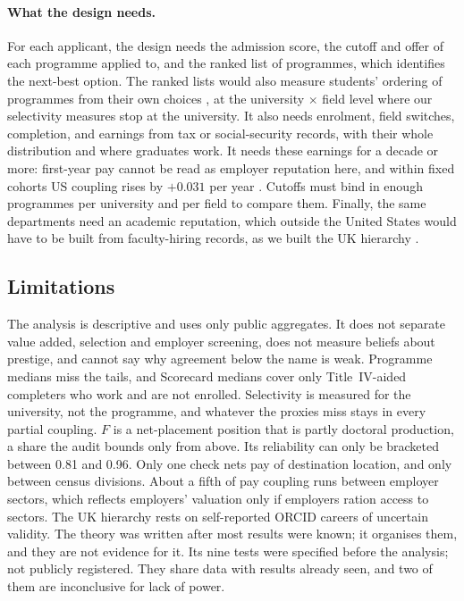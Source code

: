 \paragraph{What the design needs.} For each applicant, the design needs the admission score, the cutoff and offer of
each programme applied to, and the ranked list of programmes, which identifies the next-best option. The ranked
lists would also measure students' ordering of programmes from their own choices \citep{avery2013revealed}, at the
university $\times$ field level where our selectivity measures stop at the university. It also needs enrolment,
field switches, completion, and earnings from tax or social-security records, with their whole distribution and
where graduates work. It needs these earnings for a decade or more: first-year pay cannot be read as employer
reputation here, and within fixed cohorts US coupling rises by $+0.031$ per year . Cutoffs must
bind in enough programmes per university and per field to compare them. Finally, the same departments need an
academic reputation, which outside the United States would have to be built from faculty-hiring records, as we built
the UK hierarchy \citep{li2026orcid}.

\subsection{Limitations}\label{sec:limits}

The analysis is descriptive and uses only public aggregates. It does not separate value added, selection and
employer screening, does not measure beliefs about prestige, and cannot say why agreement below the name is weak.
Programme medians miss the tails, and Scorecard medians cover only Title~IV-aided completers who work and are not
enrolled. Selectivity is measured for the university, not the programme, and whatever the proxies miss stays in
every partial coupling. $F$ is a net-placement position that is partly doctoral production, a share the audit bounds
only from above. Its reliability can only be bracketed between 0.81 and 0.96. Only one check nets pay of destination
location, and only between census divisions. About a fifth of pay coupling runs between employer sectors, which
reflects employers' valuation only if employers ration access to sectors. The UK hierarchy rests on self-reported
ORCID careers of uncertain validity. The theory was written after most results were known; it organises them, and
they are not evidence for it. Its nine tests were specified before the analysis; not publicly registered. They share
data with results already seen, and two of them are inconclusive for lack of power.
